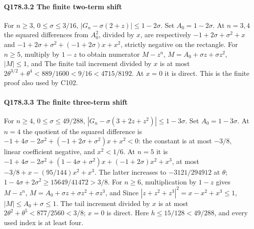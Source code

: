 \paragraph{Q178.3.2 The finite two-term shift}\label{part:Q178.3.2}
For $n\ge\allowbreak 3$, $0\le\allowbreak \sigma\le\allowbreak 3/16$,
$|G_n-\sigma(2+z)|\le\allowbreak 1-2\sigma$.
Set $A_0=\allowbreak 1-2\sigma$. At $n=\allowbreak 3,\allowbreak 4$ the squared differences from $A_0^2$,
divided by $x$, are respectively
$-1+2\sigma+\sigma^2+x$ and
$-1+2\sigma+\sigma^2+(-1+2\sigma)x+x^2$, strictly negative on the rectangle.
For $n\ge\allowbreak 5$, multiply by $1-z$ to obtain numerator $M-z^n$,
$M=\allowbreak A_0+\sigma z+\sigma z^2$, $|M|\le\allowbreak 1$, and
The finite tail increment divided by $x$ is at most
$2\theta^{3/2}+\theta^4<\allowbreak 889/1600<\allowbreak 9/16<\allowbreak 4715/8192$.
At $x=\allowbreak 0$ it is direct. This is the finite proof also used by C102.

\paragraph{Q178.3.3 The finite three-term shift}
For $n\ge\allowbreak 4$, $0\le\allowbreak \sigma\le\allowbreak 49/288$,
$|G_n-\sigma(3+2z+z^2)|\le\allowbreak 1-3\sigma$.
Set $A_0=\allowbreak 1-3\sigma$. At $n=\allowbreak 4$ the quotient of the squared difference is
$-1+4\sigma-2\sigma^2+(-1+2\sigma+\sigma^2)x+x^2<\allowbreak 0$:
the constant is at most $-3/8$, linear coefficient negative, and $x^2<\allowbreak 1/6$.
At $n=\allowbreak 5$ it is
$-1+4\sigma-2\sigma^2+(1-4\sigma+\sigma^2)x+(-1+2\sigma)x^2+x^3$,
at most $-3/8+x-(95/144)x^2+x^3$.
The latter increases to $-3121/294912$ at $\theta$;
$1-4\sigma+2\sigma^2\ge\allowbreak 15649/41472>\allowbreak 3/8$.
For $n\ge\allowbreak 6$, multiplication by $1-z$ gives $M-z^n$,
$M=\allowbreak A_0+\sigma z+\sigma z^2+\sigma z^3$, and
Since $|z+z^2+z^3|^2=\allowbreak x-x^2+x^3\le\allowbreak 1$, $|M|\le\allowbreak  A_0+\sigma\le\allowbreak 1$.
The tail increment divided by $x$ is at most
$2\theta^2+\theta^5<\allowbreak 877/2560<\allowbreak 3/8$; $x=\allowbreak 0$ is direct.
Here $h\le\allowbreak 15/128<\allowbreak 49/288$, and every used index is at least four.


